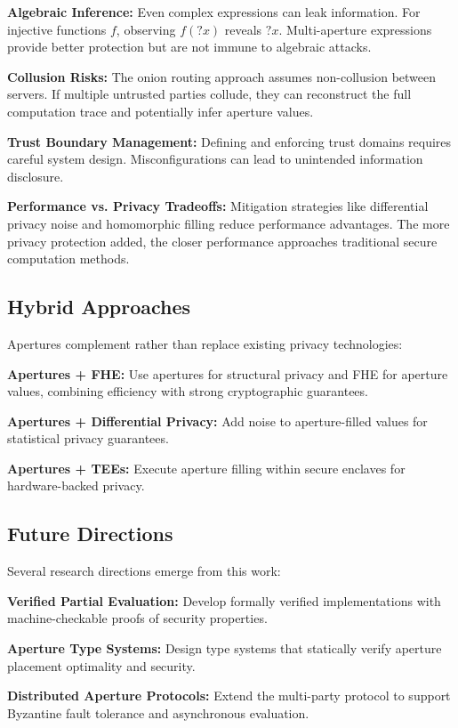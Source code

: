 \documentclass[12pt]{article}
\begin{document}
\textbf{Algebraic Inference:} Even complex expressions can leak information. For injective functions $f$, observing $f(?x)$ reveals $?x$. Multi-aperture expressions provide better protection but are not immune to algebraic attacks.

\textbf{Collusion Risks:} The onion routing approach assumes non-collusion between servers. If multiple untrusted parties collude, they can reconstruct the full computation trace and potentially infer aperture values.

\textbf{Trust Boundary Management:} Defining and enforcing trust domains requires careful system design. Misconfigurations can lead to unintended information disclosure.

\textbf{Performance vs. Privacy Tradeoffs:} Mitigation strategies like differential privacy noise and homomorphic filling reduce performance advantages. The more privacy protection added, the closer performance approaches traditional secure computation methods.

\subsection{Hybrid Approaches}

Apertures complement rather than replace existing privacy technologies:

\textbf{Apertures + FHE:} Use apertures for structural privacy and FHE for aperture values, combining efficiency with strong cryptographic guarantees.

\textbf{Apertures + Differential Privacy:} Add noise to aperture-filled values for statistical privacy guarantees.

\textbf{Apertures + TEEs:} Execute aperture filling within secure enclaves for hardware-backed privacy.

\subsection{Future Directions}

Several research directions emerge from this work:

\textbf{Verified Partial Evaluation:} Develop formally verified implementations with machine-checkable proofs of security properties.

\textbf{Aperture Type Systems:} Design type systems that statically verify aperture placement optimality and security.

\textbf{Distributed Aperture Protocols:} Extend the multi-party protocol to support Byzantine fault tolerance and asynchronous evaluation.
\end{document}
